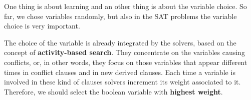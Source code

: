 One thing is about learning and an other thing is about the variable choice. So far, we chose variables randomly, but also in the SAT problems the variable
choice is very important. \vspace{7pt}

The choice of the variable is already integrated by the solvers, based on the concept of \textbf{activity-based search}. They concentrate on the variables 
causing conflicts, or, in other words, they focus on those variables that appear different times in conflict clauses and in new derived clauses. Each time a variable 
is involved in these kind of clauses solvers increment its weight associated to it. Therefore, we should select the boolean variable with \textbf{highest weight}.